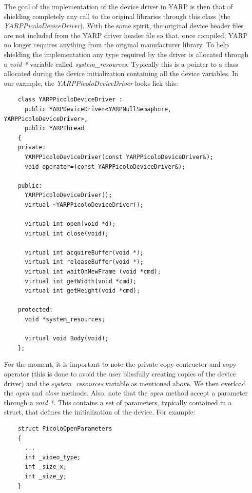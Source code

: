 The goal of the implementation of the device driver in YARP is then that of shielding completely any call to the original libraries through this class (the {\em YARPPicoloDeviceDriver}). With the same spirit, the original device header files are not included from the YARP driver header file so that, once compiled, YARP no longer requires anything from the original manufacturer library. To help shielding the implementation any type required by the driver is allocated through a {\em void *} variable called {\em system\_resources}. Typically this is a pointer to a class allocated during the device initialization containing all the device variables. In our example, the {\em YARPPicoloDeviceDriver} looks liek this:

\begin{verbatim}
    class YARPPicoloDeviceDriver : 
      public YARPDeviceDriver<YARPNullSemaphore, YARPPicoloDeviceDriver>, 
      public YARPThread
    {
    private:
      YARPPicoloDeviceDriver(const YARPPicoloDeviceDriver&);
      void operator=(const YARPPicoloDeviceDriver&);

    public:
      YARPPicoloDeviceDriver();
      virtual ~YARPPicoloDeviceDriver();

      virtual int open(void *d);
      virtual int close(void);

      virtual int acquireBuffer(void *);
      virtual int releaseBuffer(void *);
      virtual int waitOnNewFrame (void *cmd);
      virtual int getWidth(void *cmd);
      virtual int getHeight(void *cmd);

    protected:
      void *system_resources;

      virtual void Body(void);
    };
\end{verbatim}

For the moment, it is important to note the private copy contructor and copy operator (this is done to avoid the user blissfully creating copies of the device driver) and the {\em system\_resources} variable as mentioned above. We then overload the {\em open} and {\em close} methods. Also, note that the {\em open} method accept a parameter through a {\em void *}. This contains a set of parameters, typically contained in a struct, that defines the initialization of the device. For example: 

\begin{verbatim}
    struct PicoloOpenParameters
    { 
      ...
      int _video_type;
      int _size_x;
      int _size_y;
    }
\end{verbatim}


